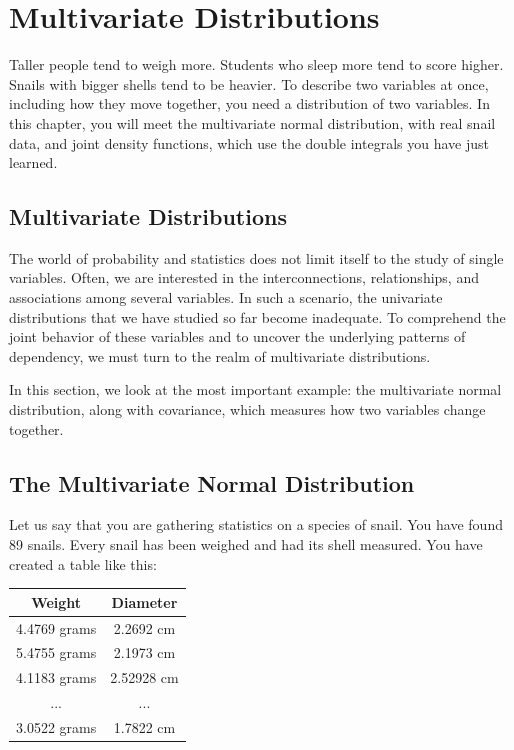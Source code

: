 \chapter{Multivariate Distributions}

Taller people tend to weigh more. Students who sleep more tend to score higher. Snails with bigger shells tend
to be heavier. To describe two variables at once, including how they move together, you need a distribution
of two variables. In this chapter, you will meet the multivariate normal distribution, with real snail data,
and joint density functions, which use the double integrals you have just learned.

\section{Multivariate Distributions}
The world of probability and statistics does not limit itself to the
study of single variables. Often, we are interested in the
interconnections, relationships, and associations among several
variables. In such a scenario, the univariate distributions that we
have studied so far become inadequate. To comprehend the joint
behavior of these variables and to uncover the underlying patterns of
dependency, we must turn to the realm of multivariate distributions.

In this section, we look at the most important example: the
multivariate normal distribution, along
with covariance, which measures how two variables change
together.

\section{The Multivariate Normal Distribution}
Let us say that you are gathering statistics on a species of snail. You have found 89 snails.
Every snail has been weighed and had its shell measured. You have created a table like this:

\begin{tabular}{ c c }
Weight & Diameter \\
\hline
4.4769 grams & 2.2692 cm\\
5.4755 grams & 2.1973 cm\\
4.1183 grams & 2.52928 cm\\
... & ... \\
3.0522 grams & 1.7822 cm
\end{tabular}


